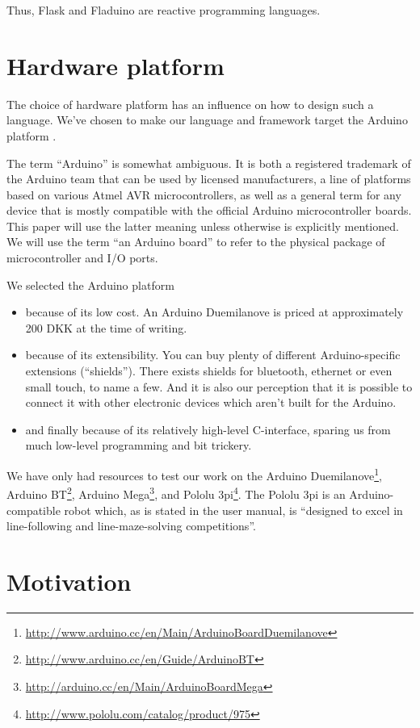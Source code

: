 \documentclass[a4paper, oneside, final]{memoir}
\begin{document}
Thus, Flask and Fladuino are reactive programming languages.


\section{Hardware platform}
\label{sec:hardware platform}
The choice of hardware platform has an influence on how to design such
a language. We've chosen to make our language and framework target the
Arduino platform \cite{arduino}.

The term ``Arduino'' is somewhat ambiguous.  It is both a registered
trademark of the Arduino team that can be used by licensed
manufacturers, a line of platforms based on various Atmel AVR
microcontrollers, as well as a general term for any device that is
mostly compatible with the official Arduino microcontroller boards.
This paper will use the latter meaning unless otherwise is explicitly
mentioned.  We will use the term ``an Arduino board'' to refer to the
physical package of microcontroller and I/O ports.

\noindent
We selected the Arduino platform 
\begin{itemize}
\item because of its low cost. An Arduino Duemilanove is priced at
  approximately 200 \nolinebreak DKK at the time of writing.
\item because of its extensibility. You can buy plenty of different
  Arduino-specific extensions (``shields''). There exists shields for
  bluetooth, ethernet or even small touch, to name a few. And it is also
  our perception that it is possible to connect it with other
  electronic devices which aren't built for the Arduino.
\item and finally because of its relatively high-level C-interface,
  sparing us from much low-level programming and bit trickery.
\end{itemize}

We have only had resources to test our work on the Arduino
Duemilanove\footnote{\url{http://www.arduino.cc/en/Main/ArduinoBoardDuemilanove}},
Arduino BT\footnote{\url{http://www.arduino.cc/en/Guide/ArduinoBT}},
Arduino
Mega\footnote{\url{http://arduino.cc/en/Main/ArduinoBoardMega}}, and
Pololu 3pi\footnote{\url{http://www.pololu.com/catalog/product/975}}.
The Pololu 3pi is an Arduino-compatible robot which, as is stated in
the user manual, is ``designed to excel in line-following and
line-maze-solving competitions''.


\section{Motivation}
\label{sec:motivation}
\end{document}

